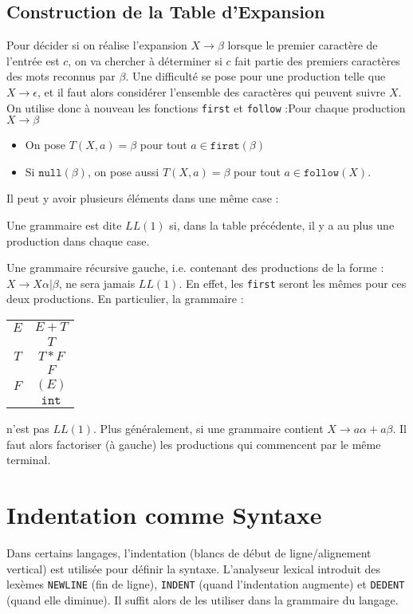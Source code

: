 \documentclass{cours}
\begin{document}
\subsection{Construction de la Table d'Expansion}
Pour décider si on réalise l'expansion $X\rightarrow\beta$ lorsque le premier caractère de l'entrée est $c$, on va chercher à déterminer si $c$ fait partie des premiers caractères des mots reconnus par $\beta$. Une difficulté se pose pour une production telle que $X\rightarrow\epsilon$, et il faut alors considérer l'ensemble des caractères qui peuvent suivre $X$. On utilise donc à nouveau les fonctions \texttt{first} et \texttt{follow} :Pour chaque production $X \rightarrow\beta$
\begin{itemize}
    \item On pose $T(X, a) = \beta$ pour tout $a \in \texttt{first}(\beta)$
    \item Si $\texttt{null}(\beta)$, on pose aussi $T(X, a) = \beta$ pour tout $a\in \texttt{follow}(X)$.
\end{itemize}
Il peut y avoir plusieurs éléments dans une même case :
\begin{definition}
    Une grammaire est dite $LL(1)$ si, dans la table précédente, il y a au plus une production dans chaque case.
\end{definition}
Une grammaire récursive gauche, i.e. contenant des productions de la forme : $X\rightarrow X\alpha | \beta$, ne sera jamais $LL(1)$. En effet, les \texttt{first} seront les mêmes pour ces deux productions. En particulier, la grammaire :
\begin{tabular}{c@{$\rightarrow$}c}
    $E$ & $E + T$        \\
        & $T$            \\
    $T$ & $T * F$        \\
        & $F$            \\
    $F$ & $( E )$        \\
        & $\texttt{int}$ \\
\end{tabular}
n'est pas $LL(1)$. Plus généralement, si une grammaire contient $X \rightarrow a\alpha + a\beta$. Il faut alors factoriser (à gauche) les productions qui commencent par le même terminal.

\section{Indentation comme Syntaxe}
Dans certains langages, l'indentation (blancs de début de ligne/alignement vertical) est utilisée pour définir la syntaxe. L'analyseur lexical introduit des lexèmes \texttt{NEWLINE} (fin de ligne), \texttt{INDENT} (quand l'indentation augmente) et \texttt{DEDENT} (quand elle diminue). Il suffit alors de les utiliser dans la grammaire du langage.
\end{document}
